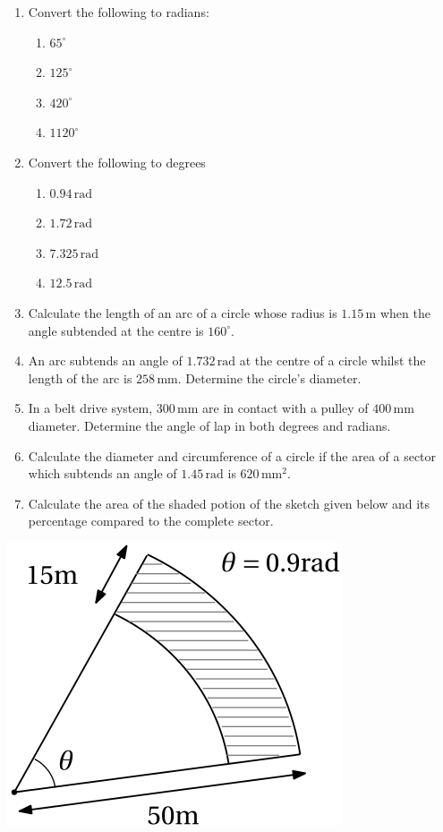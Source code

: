 \documentclass[
  12pt,
  oneside]{book}
\providecommand{\tightlist}{%
  \setlength{\itemsep}{0pt}\setlength{\parskip}{0pt}}
\theoremstyle{definition}
\theoremstyle{definition}
\theoremstyle{definition}
\theoremstyle{definition}
\theoremstyle{remark}
\begin{document}
\begin{enumerate}
\def\labelenumi{\arabic{enumi}.}
\item
  Convert the following to radians:

  \begin{enumerate}
  \def\labelenumii{\roman{enumii})}
  \tightlist
  \item
    \(65^\circ\)
  \item
    \(125^\circ\)
  \item
    \(420^\circ\)
  \item
    \(1120^\circ\)
  \end{enumerate}
\item
  Convert the following to degrees

  \begin{enumerate}
  \def\labelenumii{\roman{enumii})}
  \tightlist
  \item
    \(0.94\,\mathrm{rad}\)
  \item
    \(1.72\,\mathrm{rad}\)
  \item
    \(7.325\,\mathrm{rad}\)
  \item
    \(12.5\,\mathrm{rad}\)
  \end{enumerate}
\item
  Calculate the length of an arc of a circle whose radius is \(1.15\,\mathrm{m}\) when the angle subtended at the centre is \(160^\circ\).
\item
  An arc subtends an angle of \(1.732\,\mathrm{rad}\) at the centre of a circle whilst the length of the arc is \(258\,\mathrm{mm}\). Determine the circle's diameter.
\item
  In a belt drive system, \(300\,\mathrm{mm}\) are in contact with a pulley of \(400\,\mathrm{mm}\) diameter. Determine the angle of lap in both degrees and radians.
\item
  Calculate the diameter and circumference of a circle if the area of a sector which subtends an angle of \(1.45\,\mathrm{rad}\) is \(620\,\mathrm{mm}^2\).
\item
  Calculate the area of the shaded potion of the sketch given below and its percentage compared to the complete sector.
\end{enumerate}

\begin{center}\includegraphics{t14-arc} \end{center}
\end{document}
